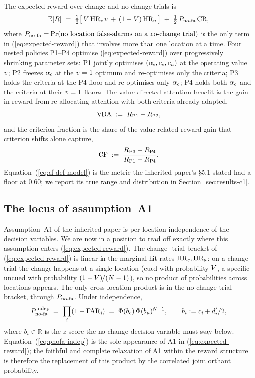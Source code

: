 The expected reward over change and no-change trials is
\begin{equation}
  \mathbb{E}[R]
  \;=\;
  \tfrac{1}{2}\big[\,V\,\mathrm{HR}_c\,v
                  \,+\,(1-V)\,\mathrm{HR}_u\,\big]
  \;+\;
  \tfrac{1}{2}\,P_{\mathrm{no\text{-}fa}}\,\mathrm{CR},
  \label{eq:expected-reward}
\end{equation}
where $P_{\mathrm{no\text{-}fa}} = \Pr(\text{no location false-alarms on a no-change
trial})$ is the only term in (\ref{eq:expected-reward}) that involves
more than one location at a time. Four nested policies P1--P4
optimise (\ref{eq:expected-reward}) over progressively shrinking
parameter sets: P1 jointly optimises $(\alpha_c, c_c, c_u)$ at the
operating value $v$; P2 freezes $\alpha_c$ at the
$v = 1$ optimum and re-optimises only the criteria; P3 holds the
criteria at the P4 floor and re-optimises only $\alpha_c$; P4 holds
both $\alpha_c$ and the criteria at their $v = 1$ floors. The
value-directed-attention benefit is the gain in reward from
re-allocating attention with both criteria already adapted,
\begin{equation}
  \mathrm{VDA} \;:=\; R_{\mathrm{P1}} - R_{\mathrm{P2}},
  \label{eq:vda-def}
\end{equation}
and the criterion fraction is the share of the value-related reward
gain that criterion shifts alone capture,
\begin{equation}
  \mathrm{CF} \;:=\;
  \frac{R_{\mathrm{P3}} - R_{\mathrm{P4}}}{R_{\mathrm{P1}} - R_{\mathrm{P4}}}.
  \label{eq:cf-def-model}
\end{equation}
Equation~(\ref{eq:cf-def-model}) is the metric the inherited paper's
§5.1 stated had a floor at $0.60$; we report its true range and
distribution in Section~\ref{sec:results-c1}.

\subsection{The locus of assumption~A1}
\label{sec:model-booking}

Assumption~A1 of the inherited paper is per-location independence of
the decision variables. We are now in a position to read off exactly
where this assumption enters (\ref{eq:expected-reward}). The change-
trial bracket of (\ref{eq:expected-reward}) is linear in the marginal
hit rates $\mathrm{HR}_c, \mathrm{HR}_u$: on a change trial the change happens at a
single location (cued with probability $V$, a specific uncued
with probability $(1 - V)/(N - 1)$), so no product of
probabilities across locations appears. The only cross-location
product is in the no-change-trial bracket, through $P_{\mathrm{no\text{-}fa}}$. Under
independence,
\begin{equation}
  P_{\mathrm{no\text{-}fa}}^{\text{indep}}
  \;=\;
  \prod_{i} (1 - \mathrm{FAR}_i)
  \;=\;
  \Phi(b_c)\,\Phi(b_u)^{N - 1},
  \qquad
  b_i := c_i + d'_i/2,
  \label{eq:pnofa-indep}
\end{equation}
where $b_i \in \mathbb{R}$ is the $z$-score the no-change decision
variable must stay below. Equation~(\ref{eq:pnofa-indep}) is the
sole appearance of A1 in (\ref{eq:expected-reward}); the faithful
and complete relaxation of A1 within the reward structure is
therefore the replacement of this product by the correlated joint
orthant probability.

